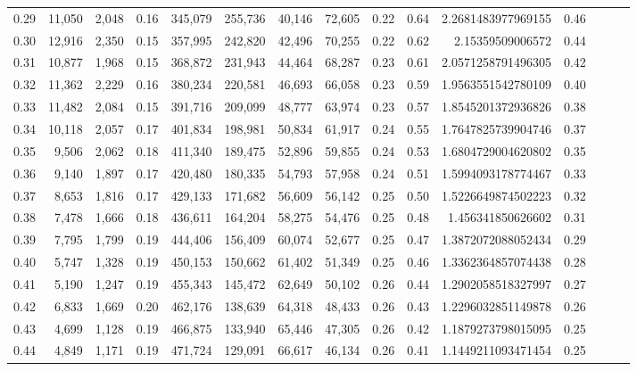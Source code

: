 \begin{tabular}{rrrrrrrrrrrrrrr}
0.29 &  11,050 &  2,048 &  0.16 &  345,079 &  255,736 &   40,146 &   72,605 &  0.22 &  0.64 &    2.2681483977969155 &      0.46 \\
0.30 &  12,916 &  2,350 &  0.15 &  357,995 &  242,820 &   42,496 &   70,255 &  0.22 &  0.62 &      2.15359509006572 &      0.44 \\
0.31 &  10,877 &  1,968 &  0.15 &  368,872 &  231,943 &   44,464 &   68,287 &  0.23 &  0.61 &    2.0571258791496305 &      0.42 \\
0.32 &  11,362 &  2,229 &  0.16 &  380,234 &  220,581 &   46,693 &   66,058 &  0.23 &  0.59 &    1.9563551542780109 &      0.40 \\
0.33 &  11,482 &  2,084 &  0.15 &  391,716 &  209,099 &   48,777 &   63,974 &  0.23 &  0.57 &    1.8545201372936826 &      0.38 \\
0.34 &  10,118 &  2,057 &  0.17 &  401,834 &  198,981 &   50,834 &   61,917 &  0.24 &  0.55 &    1.7647825739904746 &      0.37 \\
0.35 &   9,506 &  2,062 &  0.18 &  411,340 &  189,475 &   52,896 &   59,855 &  0.24 &  0.53 &    1.6804729004620802 &      0.35 \\
0.36 &   9,140 &  1,897 &  0.17 &  420,480 &  180,335 &   54,793 &   57,958 &  0.24 &  0.51 &    1.5994093178774467 &      0.33 \\
0.37 &   8,653 &  1,816 &  0.17 &  429,133 &  171,682 &   56,609 &   56,142 &  0.25 &  0.50 &    1.5226649874502223 &      0.32 \\
0.38 &   7,478 &  1,666 &  0.18 &  436,611 &  164,204 &   58,275 &   54,476 &  0.25 &  0.48 &     1.456341850626602 &      0.31 \\
0.39 &   7,795 &  1,799 &  0.19 &  444,406 &  156,409 &   60,074 &   52,677 &  0.25 &  0.47 &    1.3872072088052434 &      0.29 \\
0.40 &   5,747 &  1,328 &  0.19 &  450,153 &  150,662 &   61,402 &   51,349 &  0.25 &  0.46 &    1.3362364857074438 &      0.28 \\
0.41 &   5,190 &  1,247 &  0.19 &  455,343 &  145,472 &   62,649 &   50,102 &  0.26 &  0.44 &    1.2902058518327997 &      0.27 \\
0.42 &   6,833 &  1,669 &  0.20 &  462,176 &  138,639 &   64,318 &   48,433 &  0.26 &  0.43 &    1.2296032851149878 &      0.26 \\
0.43 &   4,699 &  1,128 &  0.19 &  466,875 &  133,940 &   65,446 &   47,305 &  0.26 &  0.42 &    1.1879273798015095 &      0.25 \\
0.44 &   4,849 &  1,171 &  0.19 &  471,724 &  129,091 &   66,617 &   46,134 &  0.26 &  0.41 &    1.1449211093471454 &      0.25 \\

\end{tabular}
